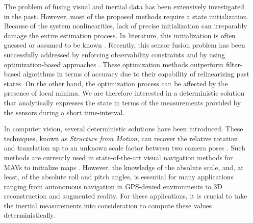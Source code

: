 \documentclass[letterpaper, 10 pt, journal, twoside]{IEEEtran}  %
\begin{document}
The problem of fusing visual and inertial data has been extensively investigated in the past.
However, most of the proposed methods require a state initialization.
Because of the system nonlinearities, lack of precise initialization can irreparably damage the entire estimation process.
In literature, this initialization is often guessed or assumed to be known \cite{Armesto2007, Li2013, Huang2009, Forster2014}. Recently, this sensor fusion problem has been successfully addressed by enforcing observability constraints \cite{Hesch2014, Huang2015} and by using optimization-based approaches \cite{Leute2014, Forster2015, mourikis2008dual, lupton2012visual, huang2011observability, mourikis2007multi, Indelman2013}. These optimization methods outperform filter-based algorithms in terms of accuracy due to their capability of relinearizing past states. On the other hand, the optimization process can be affected by the presence of local minima.
We are therefore interested in a deterministic solution that analytically expresses the state in terms of the measurements provided by the sensors during a short time-interval.

In computer vision, several deterministic solutions have been introduced.
These techniques, known as {\it Structure from Motion}, can recover the relative rotation and translation up to an unknown scale factor between two camera poses \cite{Hartley2004}.
Such methods are currently used in state-of-the-art visual navigation methods for MAVs to initialize maps \cite{Weiss2012, Forster2014, FaesslerICRA15}.
However, the knowledge of the absolute scale, and, at least, of the absolute roll and pitch angles, is essential for many applications ranging from autonomous navigation in GPS-denied environments to 3D reconstruction and augmented reality.
For these applications, it is crucial to take the inertial measurements into consideration to compute these values deterministically.

\end{document}
